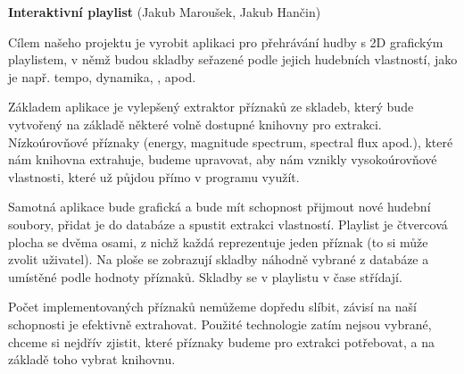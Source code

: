 \chyph
\parskip=0.3cm
\parindent=0pt

{\bf Interaktivní playlist} (Jakub Maroušek, Jakub Hančin)

Cílem našeho projektu je vyrobit aplikaci pro přehrávání hudby s 2D grafickým
playlistem, v němž budou skladby seřazené podle jejich hudebních vlastností,
jako je např. tempo, dynamika, , apod.

Základem aplikace je vylepšený extraktor příznaků ze skladeb, který bude
vytvořený na základě některé volně dostupné knihovny pro extrakci.
Nízkoúrovňové příznaky (energy, magnitude spectrum, spectral flux apod.), které
nám knihovna extrahuje, budeme upravovat, aby nám vznikly vysokoúrovňové
vlastnosti, které už půjdou přímo v programu využít.

Samotná aplikace bude grafická a bude mít schopnost přijmout nové hudební
soubory, přidat je do databáze a spustit extrakci vlastností. Playlist je
čtvercová plocha se dvěma osami, z nichž každá reprezentuje jeden příznak (to
si může zvolit uživatel). Na ploše se zobrazují skladby náhodně vybrané z
databáze a umístěné podle hodnoty příznaků. Skladby se v playlistu v čase
střídají.

Počet implementovaných příznaků nemůžeme dopředu slíbit, závisí na naší
schopnosti je efektivně extrahovat. Použité technologie zatím nejsou vybrané,
chceme si nejdřív zjistit, které příznaky budeme pro extrakci potřebovat, a na
základě toho vybrat knihovnu.

\bye
